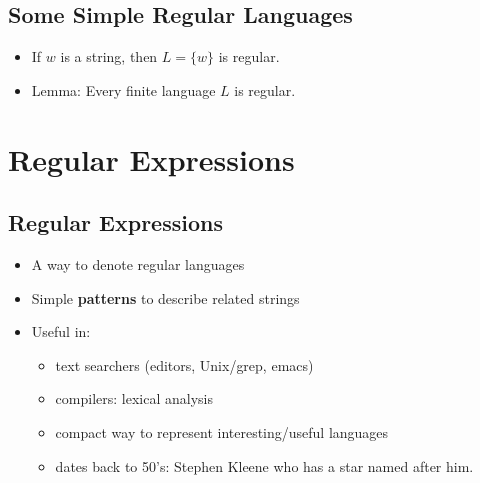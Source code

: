 \documentclass[12pt]{article}
\begin{document}
\subsection{Some Simple Regular Languages}
\begin{itemize}
    \item If $w$ is a string, then $L = \{ w \}$ is regular.
    \item Lemma: Every finite language $L$ is regular.
\end{itemize}

\section{Regular Expressions}

\subsection{Regular Expressions}
\begin{itemize}
    \item A way to denote regular languages
    \item Simple \textbf{patterns} to describe related strings
    \item Useful in:
    \begin{itemize}
        \item text searchers (editors, Unix/grep, emacs)
        \item compilers: lexical analysis
        \item compact way to represent interesting/useful languages
        \item dates back to 50's: Stephen Kleene who has a star named after him.
    \end{itemize}
\end{itemize}
\end{document}
